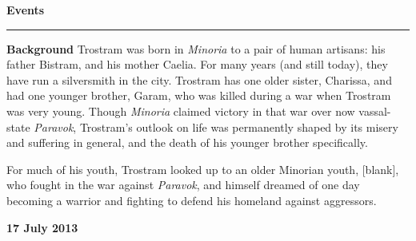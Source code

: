 \documentclass[letterpaper]{article}
\newlength\tindent
\newcommand{\e}[1]{\emph{#1}}
\newcommand{\B}[1]{\textbf{#1}}
\newenvironment{notesection}[1]
{ {\huge \B{#1}}\hrule\vspace{0.5em}\begingroup\fontsize{9pt}{12pt}\selectfont}
{\endgroup}
\begin{document}


\begin{notesection}{Events}
\setlength{\parindent}{\tindent}
\B{Background} Trostram was born in \e{Minoria} to a pair of human artisans: his father Bistram, and his mother Caelia. For many years (and still today), they have run a silversmith in the city.  Trostram has one older sister, Charissa, and had one younger brother, Garam, who was killed during a war when Trostram was very young. Though \e{Minoria} claimed victory in that war over now vassal-state \e{Paravok}, Trostram's outlook on life was permanently shaped by its misery and suffering in general, and the death of his younger brother specifically.  

For much of his youth, Trostram looked up to an older Minorian youth, [blank], who fought in the war against \e{Paravok}, and himself dreamed of one day becoming a warrior and fighting to defend his homeland against aggressors. 





\B{17 July 2013}


\end{notesection}
\end{document}
